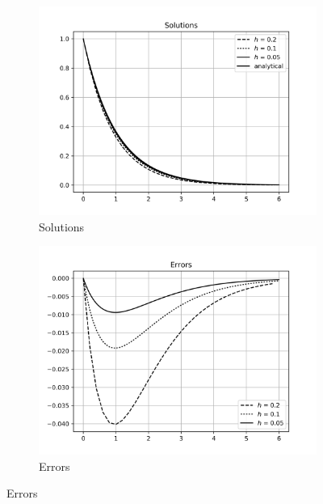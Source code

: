 \documentclass[12,a4paper]{article}
\begin{document}
    \begin{figure}[H]
        \centering
        \begin{subfigure}[t]{0.49\textwidth}
            \includegraphics[width = \textwidth]{plots/euler_1.png}
            \caption{Solutions}
            \label{fig:sol_e1}
        \end{subfigure}
        \begin{subfigure}[t]{0.49\textwidth}
            \includegraphics[width = \textwidth]{plots/euler_error_1.png}
            \caption{Errors}
            \label{fig:err_e1}
        \end{subfigure}
    \end{figure}
    
\end{document}
